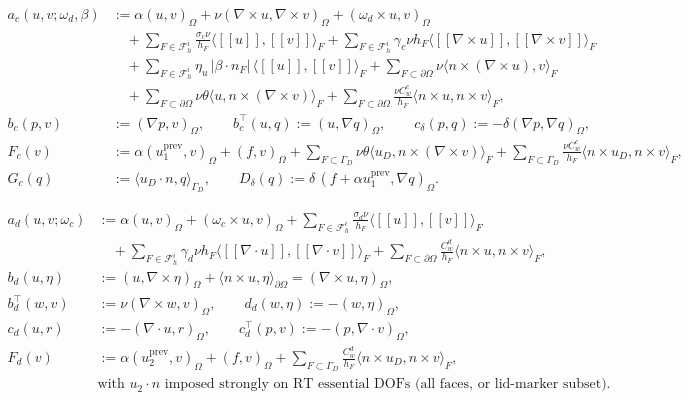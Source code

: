 \documentclass[11pt]{article}
\begin{document}
\begin{align}
	a_c(u,v;\omega_d,\beta)
	         & := \alpha (u,v)_\Omega
	+ \nu(\nabla\times u,\nabla\times v)_\Omega
	+ (\omega_d\times u,v)_\Omega                                                                       \\
	         & \quad + \sum_{F\in\mathcal F_h^i}\frac{\sigma_c\nu}{h_F}
	\langle [\![u]\!],[\![v]\!]\rangle_F
	+ \sum_{F\in\mathcal F_h^i}\gamma_c\nu h_F
	\langle [\![\nabla\times u]\!],[\![\nabla\times v]\!]\rangle_F                                      \\
	         & \quad + \sum_{F\in\mathcal F_h^i}\eta_u\,|\beta\cdot n_F|\,
	\langle [\![u]\!],[\![v]\!]\rangle_F
	+ \sum_{F\subset\partial\Omega}\nu\langle n\times(\nabla\times u),v\rangle_F                        \\
	         & \quad + \sum_{F\subset\partial\Omega}\nu\theta\langle u,n\times(\nabla\times v)\rangle_F
	+ \sum_{F\subset\partial\Omega}\frac{\nu C_w^c}{h_F}\langle n\times u,n\times v\rangle_F,
	\\[0.2em]
	b_c(p,v) & := (\nabla p,v)_\Omega,
	\qquad b_c^\top(u,q):=(u,\nabla q)_\Omega,
	\qquad c_\delta(p,q):=-\delta(\nabla p,\nabla q)_\Omega,
	\\[0.2em]
	F_c(v)
	         & := \alpha(u_1^{\mathrm{prev}},v)_\Omega + (f,v)_\Omega
	+ \sum_{F\subset\Gamma_D}\nu\theta\langle u_D,n\times(\nabla\times v)\rangle_F
	+ \sum_{F\subset\Gamma_D}\frac{\nu C_w^c}{h_F}\langle n\times u_D,n\times v\rangle_F,
	\\[0.2em]
	G_c(q)   & :=\langle u_D\cdot n,q\rangle_{\Gamma_D},
	\qquad D_\delta(q):=\delta\,(f+\alpha u_1^{\mathrm{prev}},\nabla q)_\Omega.
\end{align}

\begin{align}
	a_d(u,v;\omega_c)
	              & := \alpha (u,v)_\Omega + (\omega_c\times u,v)_\Omega
	+ \sum_{F\in\mathcal F_h^i}\frac{\sigma_d\nu}{h_F}
	\langle [\![u]\!],[\![v]\!]\rangle_F                                                                                   \\
	              & \quad + \sum_{F\in\mathcal F_h^i}\gamma_d\nu h_F
	\langle [\![\nabla\cdot u]\!],[\![\nabla\cdot v]\!]\rangle_F
	+ \sum_{F\subset\partial\Omega}\frac{C_w^d}{h_F}\langle n\times u,n\times v\rangle_F,
	\\[0.2em]
	b_d(u,\eta)   & := (u,\nabla\times\eta)_\Omega + \langle n\times u,\eta\rangle_{\partial\Omega}
	= (\nabla\times u,\eta)_\Omega,
	\\[0.2em]
	b_d^\top(w,v) & := \nu(\nabla\times w,v)_\Omega,
	\qquad d_d(w,\eta):=-(w,\eta)_\Omega,
	\\[0.2em]
	c_d(u,r)      & :=-(\nabla\cdot u,r)_\Omega,
	\qquad c_d^\top(p,v):=-(p,\nabla\cdot v)_\Omega,
	\\[0.2em]
	F_d(v)
	              & := \alpha(u_2^{\mathrm{prev}},v)_\Omega + (f,v)_\Omega
	+ \sum_{F\subset\Gamma_D}\frac{C_w^d}{h_F}\langle n\times u_D,n\times v\rangle_F,
	\\[0.2em]
	              & \text{with }u_2\cdot n\text{ imposed strongly on RT essential DOFs (all faces, or lid-marker subset).}
\end{align}
\end{document}
